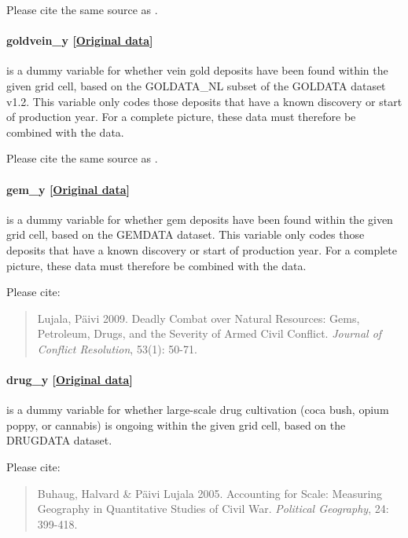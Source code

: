 \documentclass[]{book}
\begin{document}
Please cite the same source as .

\paragraph{goldvein\_y
{[}\href{http://www.researchgate.net/profile/Sara_Balestri}{Original
data}{]}}\label{goldvein-y}

is a dummy variable for whether vein gold deposits have been found
within the given grid cell, based on the GOLDATA\_NL subset of the
GOLDATA dataset v1.2. This variable only codes those deposits that have
a known discovery or start of production year. For a complete picture,
these data must therefore be combined with the 
data.

Please cite the same source as .

\paragraph{gem\_y
{[}\href{http://paivilujala.weebly.com/gemdata.html}{Original
data}{]}}\label{gem-y}

is a dummy variable for whether gem deposits have been found within the
given grid cell, based on the GEMDATA dataset. This variable only codes
those deposits that have a known discovery or start of production year.
For a complete picture, these data must therefore be combined with the
 data.

Please cite:

\begin{quote}
Lujala, Päivi 2009. Deadly Combat over Natural Resources: Gems,
Petroleum, Drugs, and the Severity of Armed Civil Conflict.
\emph{Journal of Conflict Resolution}, 53(1): 50-71.
\end{quote}

\paragraph{drug\_y
{[}\href{http://paivilujala.weebly.com/drugdata.html}{Original
data}{]}}\label{drug-y}

is a dummy variable for whether large-scale drug cultivation (coca bush,
opium poppy, or cannabis) is ongoing within the given grid cell, based
on the DRUGDATA dataset.

Please cite:

\begin{quote}
Buhaug, Halvard \& Päivi Lujala 2005. Accounting for Scale: Measuring
Geography in Quantitative Studies of Civil War. \emph{Political
Geography}, 24: 399-418.
\end{quote}
\end{document}
